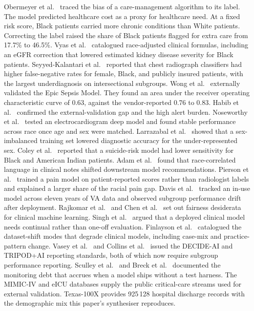 \documentclass[acmsmall,nonacm,review,anonymous]{acmart}
\newcommand{\1}[1]{\mathbf{1}\!\left\{#1\right\}}
\begin{document}
Obermeyer et al.\ \cite{obermeyer2019} traced the bias of a care-management algorithm to its label. The model predicted healthcare cost as a proxy for healthcare need. At a fixed risk score, Black patients carried more chronic conditions than White patients. Correcting the label raised the share of Black patients flagged for extra care from 17.7\% to 46.5\%. Vyas et al.\ \cite{vyas2020} catalogued race-adjusted clinical formulas, including an eGFR correction that lowered estimated kidney disease severity for Black patients. Seyyed-Kalantari et al.\ \cite{seyyed2021} reported that chest radiograph classifiers had higher false-negative rates for female, Black, and publicly insured patients, with the largest underdiagnosis on intersectional subgroups. Wong et al.\ \cite{wong2021} externally validated the Epic Sepsis Model. They found an area under the receiver operating characteristic curve of 0.63, against the vendor-reported 0.76 to 0.83. Habib et al.\ \cite{habib2021} confirmed the external-validation gap and the high alert burden. Noseworthy et al.\ \cite{noseworthy2020} tested an electrocardiogram deep model and found stable performance across race once age and sex were matched. Larrazabal et al.\ \cite{larrazabal2020} showed that a sex-imbalanced training set lowered diagnostic accuracy for the under-represented sex. Coley et al.\ \cite{coley2021} reported that a suicide-risk model had lower sensitivity for Black and American Indian patients. Adam et al.\ \cite{adam2022sepsis} found that race-correlated language in clinical notes shifted downstream model recommendations. Pierson et al.\ \cite{pierson2021} trained a pain model on patient-reported scores rather than radiologist labels and explained a larger share of the racial pain gap. Davis et al.\ \cite{davis2025} tracked an in-use model across eleven years of VA data and observed subgroup performance drift after deployment. Rajkomar et al.\ \cite{rajkomar2018} and Chen et al.\ \cite{chen2020ethical} set out fairness desiderata for clinical machine learning. Singh et al.\ \cite{singh2022} argued that a deployed clinical model needs continual rather than one-off evaluation. Finlayson et al.\ \cite{finlayson2021} catalogued the dataset-shift modes that degrade clinical models, including case-mix and practice-pattern change. Vasey et al.\ \cite{rivera2022} and Collins et al.\ \cite{collins2024tripod} issued the DECIDE-AI and TRIPOD+AI reporting standards, both of which now require subgroup performance reporting. Sculley et al.\ \cite{sculley2015} and Breck et al.\ \cite{breck2017} documented the monitoring debt that accrues when a model ships without a test harness. The MIMIC-IV \cite{johnson2023mimic} and eICU \cite{pollard2018eicu} databases supply the public critical-care streams used for external validation. Texas-100X \cite{jayaraman2022texas100x} provides 925\,128 hospital discharge records with the demographic mix this paper's synthesiser reproduces.
\end{document}
